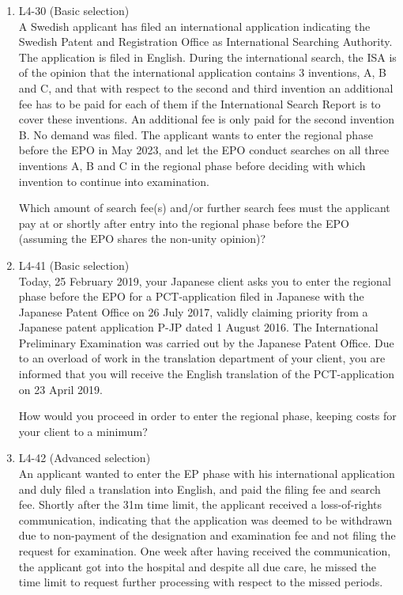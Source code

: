 \documentclass{report}
\begin{document}
\begin{enumerate}[label=\textbf{Question \arabic*}]
\begin{enumerate}[label=\textbf{Question \arabic*}]
    \item %
    L4-30 (Basic selection) \\
    A Swedish applicant has filed an international application indicating the Swedish Patent and Registration Office as International Searching Authority. The application is filed in English. During the international search, the ISA is of the opinion that the international application contains 3 inventions, A, B and C, and that with respect to the second and third invention an additional fee has to be paid for each of them if the International Search Report is to cover these inventions. An additional fee is only paid for the second invention B. No demand was filed. The applicant wants to enter the regional phase before the EPO in May 2023, and let the EPO conduct searches on all three inventions A, B and C in the regional phase before deciding with which invention to continue into examination.
    
    \vspace{1em}
    Which amount of search fee(s) and/or further search fees must the applicant pay at or shortly after entry into the regional phase before the EPO (assuming the EPO shares the non-unity opinion)?

    \item %
    L4-41 (Basic selection) \\
    Today, 25 February 2019, your Japanese client asks you to enter the regional phase before the EPO for a PCT-application filed in Japanese with the Japanese Patent Office on 26 July 2017, validly claiming priority from a Japanese patent application P-JP dated 1 August 2016. The International Preliminary Examination was carried out by the Japanese Patent Office. Due to an overload of work in the translation department of your client, you are informed that you will receive the English translation of the PCT-application on 23 April 2019.
    
    \vspace{1em}
    How would you proceed in order to enter the regional phase, keeping costs for your client to a minimum?

    \item %
    L4-42 (Advanced selection) \\
    An applicant wanted to enter the EP phase with his international application and duly filed a translation into English, and paid the filing fee and search fee. Shortly after the 31m time limit, the applicant received a loss-of-rights communication, indicating that the application was deemed to be withdrawn due to non-payment of the designation and examination fee and not filing the request for examination. One week after having received the communication, the applicant got into the hospital and despite all due care, he missed the time limit to request further processing with respect to the missed periods. 
    

\end{enumerate}
\end{enumerate}
\end{document}
